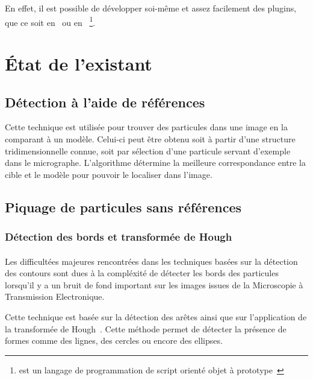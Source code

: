 \documentclass[12pt,a4paper]{report}
\begin{document}
\noindent
En effet, il est possible de développer soi-même et assez facilement des plugins, que ce soit en \java\ ou en \js ~\footnote{\js est un langage de programmation de script orienté objet à prototype~\cite{javascript:url}}.

\section{\'Etat de l'existant}

\subsection{Détection à l'aide de références}

Cette technique est utilisée pour trouver des particules dans une image en la comparant à un modèle. Celui-ci peut \^etre obtenu soit à partir d'une structure tridimensionnelle connue, soit par sélection d'une particule servant d'exemple dans le micrographe. L'algorithme détermine la meilleure correspondance entre la cible et le modèle pour pouvoir le localiser dans l'image.%

\subsection{Piquage de particules sans références}

\subsubsection{Détection des bords et transformée de Hough}



\paragraph*{}
Les difficultées majeures rencontrées dans les techniques basées sur la détection des contours sont dues à la compléxité de détecter les bords des particules lorsqu'il y a un bruit de fond important sur les images issues de la Microscopie à Transmission Electronique.%

\noindent
Cette technique est basée sur la détection des arêtes ainsi que sur l'application de la transformée de Hough~\cite{PdetectEHT:article}. Cette méthode permet de détecter la présence de formes comme des lignes, des cercles ou encore des ellipses.%
\end{document}

